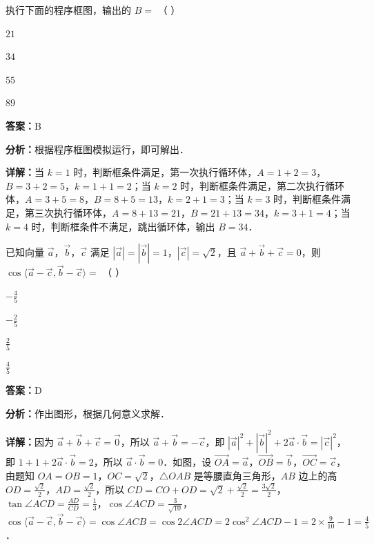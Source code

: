 \begin{question}[points=5]
执行下面的程序框图，输出的 $B = $ （                         ）
\begin{choices}
  \item $21$
  \item $34$
  \item $55$
  \item $89$
\end{choices}
\begin{solution}
\textbf{答案：}B

\textbf{分析：}根据程序框图模拟运行，即可解出．

\textbf{详解：}当 $k = 1$ 时，判断框条件满足，第一次执行循环体，$A = 1 + 2 = 3$，$B = 3 + 2 = 5$，$k = 1 + 1 = 2$；当 $k = 2$ 时，判断框条件满足，第二次执行循环体，$A = 3 + 5 = 8$，$B = 8 + 5 = 13$，$k = 2 + 1 = 3$；当 $k = 3$ 时，判断框条件满足，第三次执行循环体，$A = 8 + 13 = 21$，$B = 21 + 13 = 34$，$k = 3 + 1 = 4$；当 $k = 4$ 时，判断框条件不满足，跳出循环体，输出 $B = 34$．
\end{solution}
\end{question}

\begin{question}[points=5]
已知向量 $\vec{a}$，$\vec{b}$，$\vec{c}$ 满足 $|\vec{a}| = |\vec{b}| = 1$，$|\vec{c}| = \sqrt{2}$，且 $\vec{a} + \vec{b} + \vec{c} = 0$，则 $\cos\langle \vec{a} - \vec{c}, \vec{b} - \vec{c} \rangle = $ （               ）
\begin{choices}
  \item $-\frac{4}{5}$
  \item $-\frac{2}{5}$
  \item $\frac{2}{5}$
  \item $\frac{4}{5}$
\end{choices}
\begin{solution}
\textbf{答案：}D

\textbf{分析：}作出图形，根据几何意义求解．

\textbf{详解：}因为 $\vec{a} + \vec{b} + \vec{c} = \vec{0}$，所以 $\vec{a} + \vec{b} = -\vec{c}$，即 $|\vec{a}|^2 + |\vec{b}|^2 + 2\vec{a} \cdot \vec{b} = |\vec{c}|^2$，即 $1 + 1 + 2\vec{a} \cdot \vec{b} = 2$，所以 $\vec{a} \cdot \vec{b} = 0$．如图，设 $\overrightarrow{OA} = \vec{a}$，$\overrightarrow{OB} = \vec{b}$，$\overrightarrow{OC} = \vec{c}$，由题知 $OA = OB = 1$，$OC = \sqrt{2}$，$\triangle OAB$ 是等腰直角三角形，$AB$ 边上的高 $OD = \frac{\sqrt{2}}{2}$，$AD = \frac{\sqrt{2}}{2}$，所以 $CD = CO + OD = \sqrt{2} + \frac{\sqrt{2}}{2} = \frac{3\sqrt{2}}{2}$，$\tan \angle ACD = \frac{AD}{CD} = \frac{1}{3}$，$\cos \angle ACD = \frac{3}{\sqrt{10}}$，$\cos\langle \vec{a} - \vec{c}, \vec{b} - \vec{c} \rangle = \cos \angle ACB = \cos 2\angle ACD = 2\cos^2 \angle ACD - 1 = 2 \times \frac{9}{10} - 1 = \frac{4}{5}$．
\end{solution}
\end{question}

